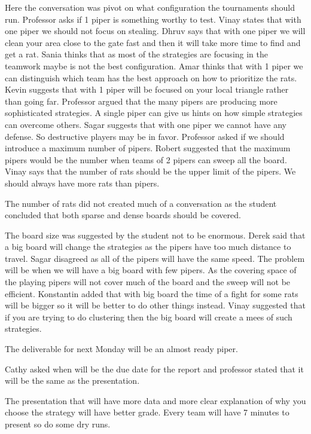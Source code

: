 Here the conversation was pivot on what configuration the tournaments should run.
Professor asks if 1 piper is something worthy to test.
Vinay states that with one piper we should not focus on stealing.
Dhruv says that with one piper we will clean your area close to the gate fast and then it will take more time to find and get a rat.
Sania thinks that as most of the strategies are focusing in the teamwork maybe is not the best configuration. 
Amar thinks that with 1 piper we can distinguish which team has the best approach on how to prioritize the rats.
Kevin suggests that with 1 piper will be focused on your local triangle rather than going far.
Professor argued that the many pipers are producing more sophisticated strategies. A single piper can give us hints on how simple strategies can overcome others.
Sagar suggests that with one piper we cannot have any defense. So destructive players may be in favor.
Professor asked if we should introduce a maximum number of pipers.
Robert suggested that the maximum pipers would be the number when teams of 2 pipers can sweep all the board.
Vinay says that the number of rats should be the upper limit of the pipers. We should always have more rats than pipers.

The number of rats did not created much of a conversation as the student concluded that both sparse and dense boards should be covered.

The board size was suggested by the student not to be enormous.
Derek said that a big board will change the strategies as the pipers have too much distance to travel.
Sagar disagreed as all of the pipers will have the same speed. The problem will be when we will have a big board with few pipers. As the covering space of the playing pipers will not cover much of the board and the sweep will not be efficient.
Konstantin added that with big board the time of a fight for some rats will be bigger so it will be better to do other things instead.
Vinay suggested that if you are trying to do clustering then the big board will create a mees of such strategies.

The deliverable for next Monday will be an almost ready piper.

Cathy asked when will be the due date for the report and professor stated that it will be the same as the presentation. 

The presentation that will have more data and more clear explanation of why you choose the strategy will have better grade.
Every team will have 7 minutes to present so do some dry runs.


